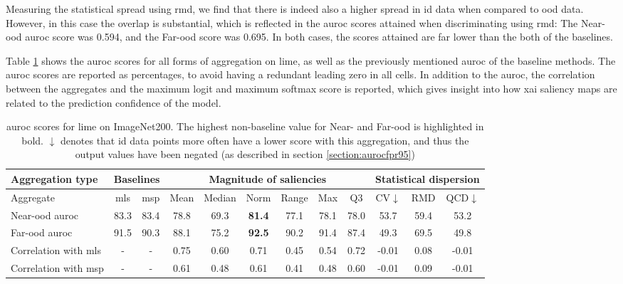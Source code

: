 \documentclass[UKenglish]{uiomasterthesis} %
\theoremstyle{definition}
\begin{document}
Measuring the statistical spread using \ac{rmd}, we find that there is indeed also a higher spread in \ac{id} data when compared to \ac{ood} data. However, in this case the overlap is substantial, which is reflected in the \ac{auroc} scores attained when discriminating using \ac{rmd}: The Near-\ac{ood} \ac{auroc} score was 0.594, and the Far-\ac{ood} score was 0.695. In both cases, the scores attained are far lower than the both of the baselines.

Table \ref{table:imagenet200_lime_metrics} shows the \ac{auroc} scores for all forms of aggregation on \ac{lime}, as well as the previously mentioned \ac{auroc} of the baseline methods. The \ac{auroc} scores are reported as percentages, to avoid having a redundant leading zero in all cells. In addition to the \ac{auroc}, the correlation between the aggregates and the maximum logit and maximum softmax score is reported, which gives insight into how \ac{xai} saliency maps are related to the prediction confidence of the model.

\begin{table}[H]
\setlength\tabcolsep{3pt}
\begin{center}
\begin{tabular}{ |p{5.1em}|c c|c c c c c c|c c c| }
    \hline
     \centering Aggregation type & \multicolumn{2}{c|}{Baselines} & \multicolumn{6}{c|}{Magnitude of saliencies} & \multicolumn{3}{p{8em}|}{\centering Statistical dispersion} \\
    \hline
    Aggregate & \ac{mls} & \ac{msp} & Mean & Median & Norm & Range & Max & Q3 & CV$\downarrow$ & RMD & QCD$\downarrow$  \\
    \hline
    \rowcolor{near!50}
    Near-\ac{ood} \ac{auroc} & 83.3 & 83.4 & 78.8 & 69.3 &\textbf{ 81.4 }& 77.1 & 78.1 & 78.0 & 53.7 & 59.4 & 53.2  \\
    \hline
    \rowcolor{far!50}
    Far-\ac{ood} \ac{auroc} & 91.5 & 90.3 & 88.1 & 75.2 &\textbf{ 92.5 }& 90.2 & 91.4 & 87.4 & 49.3 & 69.5 & 49.8  \\
    \hline
    Correlation with \ac{mls}& - & - & 0.75 & 0.60 & 0.71 & 0.45 & 0.54 & 0.72 & -0.01 & 0.08 & -0.01  \\
    \hline
    Correlation with \ac{msp}& - & - & 0.61 & 0.48 & 0.61 & 0.41 & 0.48 & 0.60 & -0.01 & 0.09 & -0.01  \\
    \hline
    \end{tabular}
    \caption[\ac{auroc} scores for \ac{lime} on ImageNet200]{\ac{auroc} scores for \ac{lime} on ImageNet200. The highest non-baseline value for Near- and Far-\ac{ood} is highlighted in bold. $\downarrow$ denotes that \ac{id} data points more often have a lower score with this aggregation, and thus the output values have been negated (as described in section \ref{section:aurocfpr95})}
    \label{table:imagenet200_lime_metrics}
\end{center}
\setlength\tabcolsep{6pt}
\end{table}
\end{document}
